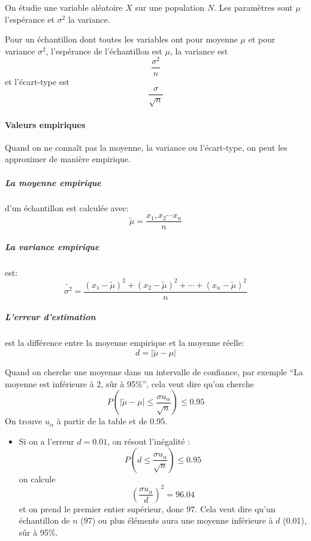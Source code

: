 \documentclass[10pt,a4paper,french]{article}
\begin{document}
On étudie une variable aléatoire $X$ sur une population $N$. Les paramètres sont $\mu$ l'espérance et $\sigma^2$ la variance.

Pour un échantillon dont toutes les variables ont pour moyenne $\mu$ et pour variance $\sigma^2$, l'espérance de l'échantillon est $\mu$, la variance est \[ \frac{\sigma^2}{n} \] et l'écart-type est \[ \frac{\sigma}{\sqrt{n}} \]

\paragraph{Valeurs empiriques}
Quand on ne connaît pas la moyenne, la variance ou l'écart-type, on peut les approximer de manière empirique.

\subparagraph{La moyenne empirique} d'un échantillon est calculée avec: \[ \tilde{\mu} = \frac{x_1, x_2 \cdots x_n}{n} \]

\subparagraph{La variance empirique} est: \[ \widetilde{\sigma^2} = \frac{(x_1 - \tilde{\mu})^2 + (x_2 - \tilde{\mu})^2 + \cdots + (x_n - \tilde{\mu})^2}{n} \]

\subparagraph{L'erreur d'estimation} est la différence entre la moyenne empirique et la moyenne réelle:
\[ d = \vert \tilde{\mu} - \mu \vert \]

Quand on cherche une moyenne dans un intervalle de confiance, par exemple ``La moyenne est inférieure à 2, sûr à 95\%'', cela veut dire qu'on cherche \[ P\left(\vert \tilde{\mu} - \mu \vert \leq \frac{\sigma u_\alpha}{\sqrt{n}}\right) \leq 0.95 \]
On trouve $u_\alpha$ à partir de la table et de 0.95.
\begin{itemize}
\item Si on a l'erreur $d=0.01$, on résout l'inégalité : \[ P\left(d \leq \frac{\sigma u_\alpha}{\sqrt{n}}\right) \leq 0.95 \]
on calcule \[ \left(\frac{\sigma u_\alpha}{d}\right)^2 = 96.04 \] et on prend le premier entier supérieur, donc $97$.
Cela veut dire qu'un échantillon de $n$ (97) ou plus éléments aura une moyenne inférieure à $d$ (0.01), sûr à 95\%.
\end{itemize}
\end{document}
